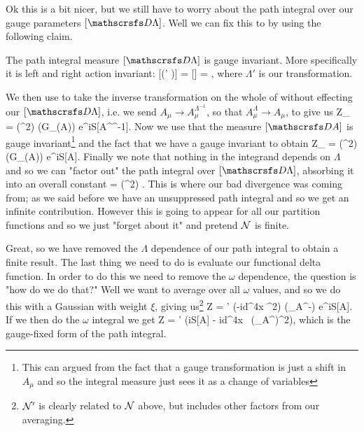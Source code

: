 Ok this is a bit nicer, but we still have to worry about the path integral over our gauge parameters $[\pD\Lambda]$. Well we can fix this to by using the following claim. 

\bcl 
    The path integral measure $[\pD \Lambda]$ is gauge invariant. More specifically it is left and right action invariant:
    \be 
    \label{eqn:PathIntegralMeasureInvariant}
        [\pD (\Lambda' \Lambda)] = [\pD \Lambda] = ,
    \ee 
    where $\Lambda'$ is our transformation. 
\ecl 

We then use  to take the inverse transformation on the whole of  without effecting our $[\pD \Lambda]$, i.e. we send $A_{\mu} \to A_{\mu}^{\Lambda^{-1}}$, so that $A_{\mu}^{\Lambda} \to A_{\mu}$, to give us 
\bse 
    Z_{\omega} = \det\bigg(\p^2\bigg) \int [\pD A^{\Lambda^{-1}}] [\pD \Lambda] \del\big(G_{\omega}(A)\big) e^{iS[A^{\Lambda^{-1}}]}.
\ese 
Now we use that the measure $[\pD A]$ is gauge invariant\footnote{This can argued from the fact that a gauge transformation is just a shift in $A_{\mu}$ and so the integral measure just sees it as a change of variables} and the fact that we have a gauge invariant to obtain 
\bse 
    Z_{\omega} = \det\bigg(\p^2\bigg) \int [\pD \Lambda] [\pD A]  \del\big(G_{\omega}(A)\big) e^{iS[A]}.
\ese
Finally we note that nothing in the integrand depends on $\Lambda$ and so we can "factor out" the path integral over $[\pD\Lambda]$, absorbing it into an overall constant
\bse 
    \cN = \det\bigg(\p^2\bigg) \int [\pD \Lambda]. 
\ese
This is where our bad divergence was coming from; as we said before we have an unsuppressed path integral and so we get an infinite contribution. However this is going to appear for all our partition functions and so we just "forget about it" and pretend $\mathcal{N}$ is finite. 

Great, so we have removed the $\Lambda$ dependence of our path integral to obtain a finite result. The last thing we need to do is evaluate our functional delta function. In order to do this we need to remove the $\omega$ dependence, the question is "how do we do that?" Well we want to average over all $\omega$ values, and so we do this with a Gaussian with weight $\xi$, giving us\footnote{$\mathcal{N}'$ is clearly related to $\mathcal{N}$ above, but includes other factors from our averaging.} 
\bse 
    Z = \cN' \int [\pD \omega] [\pD A] \exp\bigg(-i\int d^4x  \omega^2\bigg) \del\big(\p_{\mu}A^{\mu}-\omega\big) e^{iS[A]}.
\ese
If we then do the $\omega$ integral we get 
\bse 
    Z = \cN' \int [\pD A] \exp\bigg(iS[A] - i\int d^4x \,  (\p_{\mu}A^{\mu})^2\bigg),
\ese
which is the gauge-fixed form of the path integral. 

